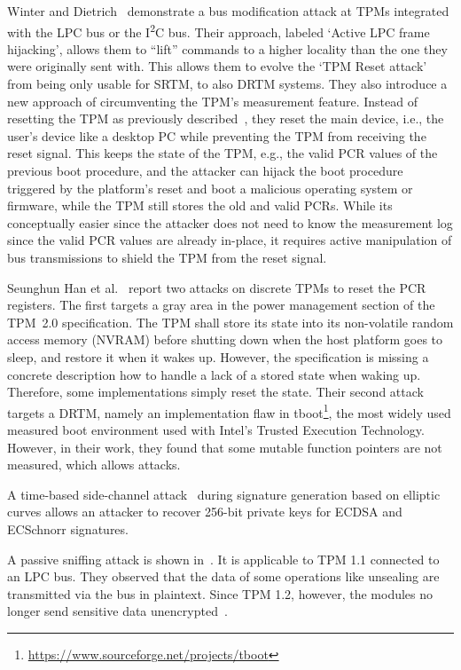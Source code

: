 Winter and Dietrich~\cite{Winter2013} demonstrate a bus modification attack at TPMs integrated with the LPC bus or the I\textsuperscript{2}C bus.
Their approach, labeled `Active LPC frame hijacking', allows them to ``lift'' commands to a higher locality than the one they were originally sent with.
This allows them to evolve the `TPM Reset attack' from being only usable for \ac{SRTM}, to also \ac{DRTM} systems.
They also introduce a new approach of circumventing the TPM's measurement feature.
Instead of resetting the TPM as previously described~\cite{kauerBernhard,sparks2007}, they reset the main device, i.e., the user's device like a desktop PC while preventing the TPM from receiving the reset signal.
This keeps the state of the TPM, e.g., the valid \ac{PCR} values of the previous boot procedure, and the attacker can hijack the boot procedure triggered by the platform's reset and boot a malicious operating system or firmware, while the TPM still stores the old and valid PCRs.
While its conceptually easier since the attacker does not need to know the measurement log since the valid \ac{PCR} values are already in-place, it requires active manipulation of bus transmissions to shield the TPM from the reset signal.

Seunghun Han et al.~\cite{aBadDream} report two attacks on discrete TPMs to reset the PCR registers.
The first targets a gray area in the power management section of the TPM~2.0 specification.
The TPM shall store its state into its non-volatile random access memory (NVRAM) before shutting down when the host platform goes to sleep, and restore it when it wakes up.
However, the specification is missing a concrete description how to handle a lack of a stored state when waking up.
Therefore, some implementations simply reset the state.
Their second attack targets a \ac{DRTM}, namely an implementation flaw in tboot\footnote{\url{https://www.sourceforge.net/projects/tboot}}, the most widely used measured boot environment used with Intel's Trusted Execution Technology.
However, in their work, they found that some mutable function pointers are not measured, which allows attacks.

A time-based side-channel attack~\cite{Moghimi2019} during signature generation based on elliptic curves allows an attacker to recover 256-bit private keys for ECDSA and ECSchnorr signatures.

A passive sniffing attack is shown in~\cite{Kursawe2005AnalyzingTP}.
It is applicable to TPM 1.1 connected to an LPC bus.
They observed that the data of some operations like unsealing are transmitted via the bus in plaintext.
Since TPM 1.2, however, the modules no longer send sensitive data unencrypted~\cite{Winter2013}.

